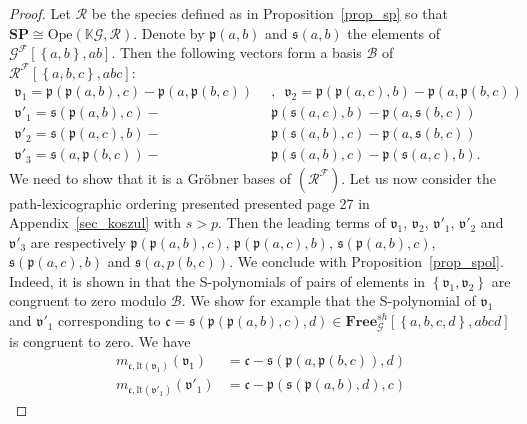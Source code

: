 \documentclass[11pt]{article}
\theoremstyle{definition}
\numberwithin{equation}{section}
\newcommand{\set}[1]{\left\{#1\right\}}
\newcommand{\op}[1]{\mathbf{#1}}
\newcommand{\K}{\mathbb{K}}
\newcommand{\free}[1]{\op{Free}_{#1}}
\newcommand{\Ope}{\mathrm{Ope}}
\newcommand{\SP}{\op{SP}}
\begin{document}
\begin{proof}
Let $\mathcal{R}$ be the species defined as in Proposition~\ref{prop_sp} so that 
$\SP\cong\Ope(\K\mathcal{G},\mathcal{R})$. Denote by $\mathfrak{p}(a,b)$ and $\mathfrak{s}(a,b)$ the 
elements of $\mathcal{G}^{\mathscr{F}}[\set{a,b},ab]$. Then the following vectors form a basis 
$\mathcal{B}$ of $\mathcal{R}^{\mathscr{F}}[\set{a,b,c},abc]$:
\begin{align}
    \mathfrak{v}_1 =\mathfrak{p}(\mathfrak{p}(a,b),c) - \mathfrak{p}(a,\mathfrak{p}(b,c))  \enspace &,\enspace 
    \mathfrak{v}_2=\mathfrak{p}(\mathfrak{p}(a,c),b) - \mathfrak{p}(a,\mathfrak{p}(b,c))\label{vec_points}\\
    \mathfrak{v'}_1=\mathfrak{s}(\mathfrak{p}(a,b),c) - &\mathfrak{p}(\mathfrak{s}(a,c),b) - \mathfrak{p}(a,\mathfrak{s}(b,c)) \label{vec_seg1} \\
    \mathfrak{v'}_2=\mathfrak{s}(\mathfrak{p}(a,c),b) - &\mathfrak{p}(\mathfrak{s}(a,b),c) - \mathfrak{p}(a, \mathfrak{s}(b,c))  \label{vec_seg2}\\
    \mathfrak{v'}_3=\mathfrak{s}(a,\mathfrak{p}(b,c)) - &\mathfrak{p}(\mathfrak{s}(a,b),c) - \mathfrak{p}(\mathfrak{s}(a,c),b).\label{vec_seg3}
\end{align}
We need to show that it is a Gröbner bases of $(\mathcal{R}^{\mathscr{F}})$. Let us now consider the 
path-lexicographic ordering presented presented page 27 in Appendix~\ref{sec_koszul} with $s>p$. Then the leading terms 
of $\mathfrak{v}_1$, $\mathfrak{v}_2$, $\mathfrak{v'}_1$, $\mathfrak{v'}_2$ and $\mathfrak{v'}_3$ are 
respectively $\mathfrak{p}(\mathfrak{p}(a,b),c)$, $\mathfrak{p}(\mathfrak{p}(a,c),b)$, 
$\mathfrak{s}(\mathfrak{p}(a,b),c)$, $\mathfrak{s}(\mathfrak{p}(a,c),b)$ and $\mathfrak{s}(a,p(b,c))$. 
We conclude with Proposition~\ref{prop_spol}. Indeed, it is shown in \cite{DK10} that the S-polynomials of 
pairs of elements in $\set{\mathfrak{v}_1,\mathfrak{v}_2}$ are congruent to zero modulo $\mathcal{B}$. We 
show for example that the S-polynomial of $\mathfrak{v}_1$ and $\mathfrak{v'}_1$ corresponding to 
$\mathfrak{c}=\mathfrak{s}(\mathfrak{p}(\mathfrak{p}(a,b),c),d)\in\free{\mathcal{G}}^{sh}[\set{a,b,c,d},abcd]$ is congruent to zero. We have
\begin{equation}\begin{split}
    m_{\mathfrak{c},\text{lt}(\mathfrak{v}_1)}(\mathfrak{v}_1) &= \mathfrak{c}-\mathfrak{s}(\mathfrak{p}(a,\mathfrak{p}(b,c)),d)\\
    m_{\mathfrak{c},\text{lt}(\mathfrak{v'}_1)}(\mathfrak{v'}_1) &= \mathfrak{c} - \mathfrak{p}(\mathfrak{s}(\mathfrak{p}(a,b),d),c)

\end{split}
\end{equation}
\end{proof}
\end{document}
